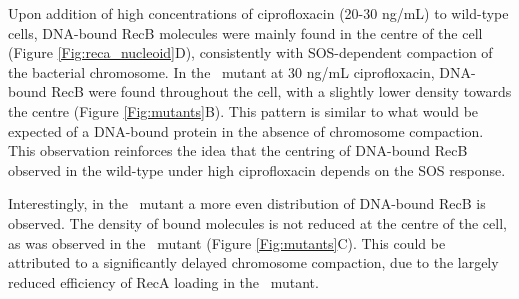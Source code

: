 Upon addition of high concentrations of ciprofloxacin (20-30 ng/mL) to wild-type cells, DNA-bound RecB molecules were mainly found in the centre of the cell (Figure \ref{Fig:reca_nucleoid}D), consistently with SOS-dependent compaction of the bacterial chromosome. In the \dreca\ mutant at 30 ng/mL ciprofloxacin, DNA-bound RecB were found throughout the cell, with a slightly lower density towards the centre (Figure \ref{Fig:mutants}B). This pattern is similar to what would be expected of a DNA-bound protein in the absence of chromosome compaction\cite{Stracy2021}. This observation reinforces the idea that the centring of DNA-bound RecB observed in the wild-type under high ciprofloxacin depends on the SOS response.

Interestingly, in the \teneighty\ mutant a more even distribution of DNA-bound RecB is observed. The density of bound molecules is not reduced at the centre of the cell, as was observed in the \dreca\ mutant (Figure \ref{Fig:mutants}C). This could be attributed to a significantly delayed chromosome compaction, due to the largely reduced efficiency of RecA loading in the \teneighty\ mutant.

